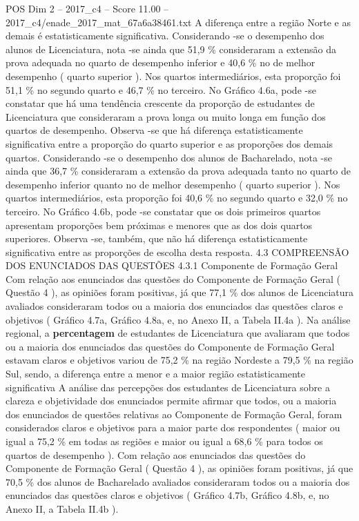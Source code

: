 \begin{textsample}{POS Dim 2 – 2017\_c4 – Score 11.00 – 2017\_c4/enade\_2017\_mat\_67a6a38461.txt}
A diferença entre a região Norte e as demais é estatisticamente significativa.
Considerando -se o desempenho dos alunos de Licenciatura, nota -se ainda que 51,9 \% consideraram a extensão da prova adequada no quarto de desempenho inferior e 40,6 \% no de melhor desempenho ( quarto superior ).
Nos quartos intermediários, esta proporção foi 51,1 \% no segundo quarto e 46,7 \% no terceiro.
No Gráfico 4.6a, pode -se constatar que há uma tendência crescente da proporção de estudantes de Licenciatura que consideraram a prova longa ou muito longa em função dos quartos de desempenho.
Observa -se que há diferença estatisticamente significativa entre a proporção do quarto superior e as proporções dos demais quartos.
Considerando -se o desempenho dos alunos de Bacharelado, nota -se ainda que 36,7 \% consideraram a extensão da prova adequada tanto no quarto de desempenho inferior quanto no de melhor desempenho ( quarto superior ).
Nos quartos intermediários, esta proporção foi 40,6 \% no segundo quarto e 32,0 \% no terceiro.
No Gráfico 4.6b, pode -se constatar que os dois primeiros quartos apresentam proporções bem próximas e menores que as dos dois quartos superiores.
Observa -se, também, que não há diferença estatisticamente significativa entre as proporções de escolha desta resposta. 4.3 COMPREENSÃO DOS ENUNCIADOS DAS QUESTÕES 4.3.1 Componente de Formação Geral Com relação aos enunciados das questões do Componente de Formação Geral ( Questão 4 ), as opiniões foram positivas, já que 77,1 \% dos alunos de Licenciatura avaliados consideraram todos ou a maioria dos enunciados das questões claros e objetivos ( Gráfico 4.7a, Gráfico 4.8a, e, no Anexo II, a Tabela II.4a ).
Na análise regional, a \textbf{percentagem} de estudantes de Licenciatura que avaliaram que todos ou a maioria dos enunciados das questões do Componente de Formação Geral estavam claros e objetivos variou de 75,2 \% na região Nordeste a 79,5 \% na região Sul, sendo, a diferença entre a menor e a maior região estatisticamente significativa A análise das percepções dos estudantes de Licenciatura sobre a clareza e objetividade dos enunciados permite afirmar que todos, ou a maioria dos enunciados de questões relativas ao Componente de Formação Geral, foram considerados claros e objetivos para a maior parte dos respondentes ( maior ou igual a 75,2 \% em todas as regiões e maior ou igual a 68,6 \% para todos os quartos de desempenho ).
Com relação aos enunciados das questões do Componente de Formação Geral ( Questão 4 ), as opiniões foram positivas, já que 70,5 \% dos alunos de Bacharelado avaliados consideraram todos ou a maioria dos enunciados das questões claros e objetivos ( Gráfico 4.7b, Gráfico 4.8b, e, no Anexo II, a Tabela II.4b ).

\end{textsample}
